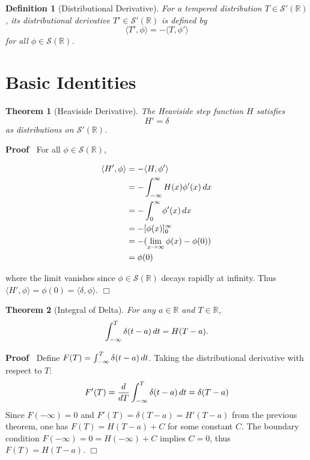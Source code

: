 \documentclass{article}
\newenvironment{proof}{\noindent\textbf{Proof\ }}{\hspace*{\fill}$\Box$\medskip}
\newtheorem{definition}{Definition}
\newtheorem{theorem}{Theorem}
\begin{document}
\begin{definition}
  [Distributional Derivative] For a tempered distribution $T \in \mathcal{S}'
  (\mathbb{R})$, its distributional derivative $T' \in \mathcal{S}'
  (\mathbb{R})$ is defined by
  \[ \langle T', \phi \rangle = - \langle T, \phi' \rangle \]
  for all $\phi \in \mathcal{S} (\mathbb{R})$.
\end{definition}

\section{Basic Identities}

\begin{theorem}
  [Heaviside Derivative] The Heaviside step function $H$ satisfies
  \[ H' = \delta \]
  as distributions on $\mathcal{S}' (\mathbb{R})$.
\end{theorem}

\begin{proof}
  For all $\phi \in \mathcal{S} (\mathbb{R})$,
  
  \begin{align}
    \langle H', \phi \rangle & = - \langle H, \phi' \rangle \\
    & = - \int_{- \infty}^{\infty} H (x) \phi' (x)  \hspace{0.17em} dx \\
    & = - \int_0^{\infty} \phi' (x)  \hspace{0.17em} dx \\
    & = - [\phi (x)]_0^{\infty} \\
    & = - (\lim_{x \to \infty} \phi (x) - \phi (0)) \\
    & = \phi (0) 
  \end{align}
  
  where the limit vanishes since $\phi \in \mathcal{S} (\mathbb{R})$ decays
  rapidly at infinity. Thus $\langle H', \phi \rangle = \phi (0) = \langle
  \delta, \phi \rangle$.
\end{proof}

\begin{theorem}
  [Integral of Delta] For any $a \in \mathbb{R}$ and $T \in \mathbb{R}$,
  \[ \int_{- \infty}^T \delta (t - a)  \hspace{0.17em} dt = H (T - a) . \]
\end{theorem}

\begin{proof}
  Define $F (T) = \int_{- \infty}^T \delta (t - a)  \hspace{0.17em} dt$.
  Taking the distributional derivative with respect to $T$:
  \[ F' (T) = \frac{d}{dT}  \int_{- \infty}^T \delta (t - a)  \hspace{0.17em}
     dt = \delta (T - a) \]
  Since $F (- \infty) = 0$ and $F' (T) = \delta (T - a) = H'  (T - a)$ from
  the previous theorem, one has $F (T) = H (T - a) + C$ for some constant $C$.
  The boundary condition $F (- \infty) = 0 = H (- \infty) + C$ implies $C =
  0$, thus $F (T) = H (T - a)$.
\end{proof}
\end{document}
